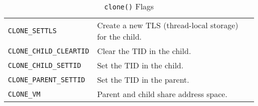 \begin{table}[h!tbp]
\begin{tabular}{ll}
    \texttt{CLONE_SETTLS} & Create a new TLS (thread-local storage) for the child. \\
    \texttt{CLONE_CHILD_CLEARTID} & Clear the TID in the child. \\
    \texttt{CLONE_CHILD_SETTID} & Set the TID in the child. \\
    \texttt{CLONE_PARENT_SETTID} & Set the TID in the parent. \\
    \texttt{CLONE_VM} & Parent and child share address space. \\
    \bottomrule
  \end{tabular}
  \caption{\texttt{clone()} Flags}
  \label{tab:Clone_Flags}
\end{table}


